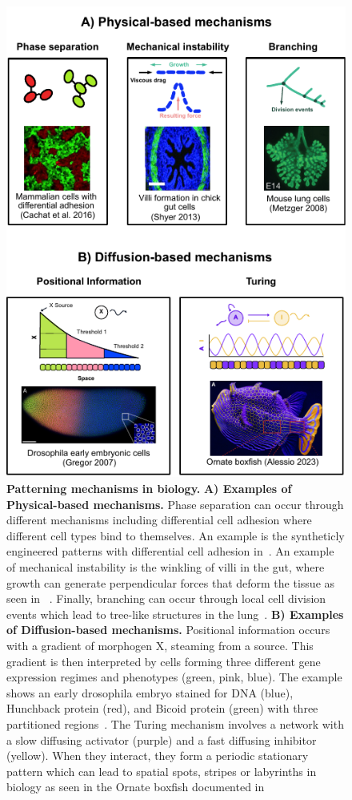 \begin{figure}[H]
    \centering
    \includegraphics[width=1\textwidth]{chapters/Introduction/mechanisms_patterning}
    \caption{\textbf{Patterning mechanisms in biology.} \textbf{A) Examples of Physical-based mechanisms.}
    Phase separation can occur through different mechanisms including differential cell adhesion where different cell types bind to themselves. An example is the syntheticly engineered patterns with differential cell adhesion in~\cite{cachat20162}.
    An example of mechanical instability is the winkling of villi in the gut, where growth can generate perpendicular forces that deform the tissue as seen in ~\cite{shyer2013villification}.
    Finally, branching can occur through local cell division events which lead to tree-like structures in the lung~\parencite{metzger2008branching}. \textbf{B) Examples of Diffusion-based mechanisms.} Positional information occurs with a gradient of morphogen X, steaming from a source. This gradient is then interpreted by cells forming three different gene expression regimes and phenotypes (green, pink, blue).
    The example shows an early drosophila embryo stained for DNA (blue), Hunchback protein (red), and Bicoid protein (green) with three partitioned regions~\parencite{gregor2007probing}. The Turing mechanism involves a network with a slow diffusing activator (purple) and a fast diffusing inhibitor (yellow). When they interact, they form a periodic stationary pattern which can lead to spatial spots, stripes or labyrinths in biology as seen in the Ornate boxfish documented in }%
    \label{fig:mechanisms_patterning}
\end{figure}
